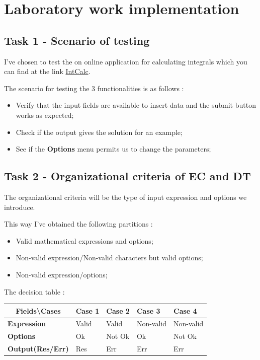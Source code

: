 \section{Laboratory work implementation} 

\subsection{Task 1 - Scenario of testing}

I've chosen to test the on online application for calculating integrals which you can find at the link \href{https://www.integral-calculator.com/}{IntCalc}.

The scenario for testing the 3 functionalities is as follows : 

\begin{itemize}
	\item Verify that the input fields are available to insert data and the submit button works as expected;
	\item Check if the output gives the solution for an example;
	\item See if the \textbf{Options} menu permits us to change the parameters;
\end{itemize}

\subsection{Task 2 - Organizational criteria of EC and DT}

The organizational criteria will be the type of input expression and options we introduce.

This way I've obtained the following partitions : 

\begin{itemize}
	\item Valid mathematical expressions and options;
	\item Non-valid expression/Non-valid characters but valid options;
	\item Non-valid expression/options;
\end{itemize}

The decision table :

\begin{table}[h]
	\begin{tabular}{|l|l|l|l|l|}
		\hline
		\multicolumn{1}{|c|}{\textbf{Fields\textbackslash{}Cases}} & \textbf{Case 1} & \textbf{Case 2} & \textbf{Case 3} & \textbf{Case 4} \\ \hline
		\textbf{Expression}      & Valid & Valid  & Non-valid & Non-valid \\ \hline
		\textbf{Options}         & Ok    & Not Ok & Ok        & Not Ok    \\ \hline
		\textbf{Output(Res/Err)} & Res   & Err    & Err       & Err       \\ \hline
	\end{tabular}
\end{table}

